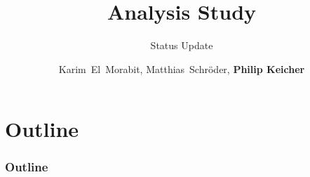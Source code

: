 \documentclass[18pt]{beamer}
\title[\ttbarH Analysis Study]{\ttbarH Analysis Study}
\subtitle{Status Update}
\author[Philip Keicher]{Karim~El~Morabit, Matthias~Schröder, \textbf{Philip Keicher}}
\institute{Institut für Experimentelle Kernphysik (IEKP)}
\begin{document}


\begin{frame}
\titlepage
\end{frame}

\section*{Outline}
\begin{frame}[label={outline}]
	\frametitle{Outline}
	\tableofcontents
\end{frame}









\beginbackup




\backupend
\end{document}
